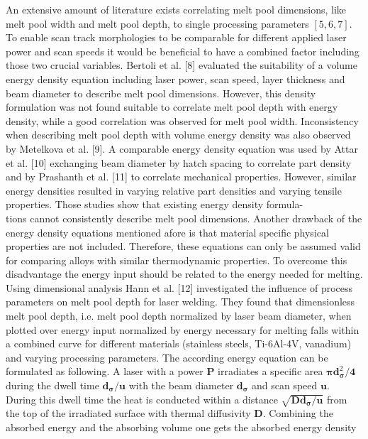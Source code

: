 \documentclass[10pt]{article}
\begin{document}
An extensive amount of literature exists correlating melt pool dimensions, like melt pool width and melt pool depth, to single processing parameters $[5,6,7]$. To enable scan track morphologies to be comparable for different applied laser power and scan speeds it would be beneficial to have a combined factor including those two crucial variables. Bertoli et al. [8] evaluated the suitability of a volume energy density equation including laser power, scan speed, layer thickness and beam diameter to describe melt pool dimensions. However, this density formulation was not found suitable to correlate melt pool depth with energy density, while a good correlation was observed for melt pool width. Inconsistency when describing melt pool depth with volume energy density was also observed by Metelkova et al. [9]. A comparable energy density equation was used by Attar et al. [10] exchanging beam diameter by hatch spacing to correlate part density and by Prashanth et al. [11] to correlate mechanical properties. However, similar energy densities resulted in varying relative part densities and varying tensile properties. Those studies show that existing energy density formula-\\
tions cannot consistently describe melt pool dimensions. Another drawback of the energy density equations mentioned afore is that material specific physical properties are not included. Therefore, these equations can only be assumed valid for comparing alloys with similar thermodynamic properties. To overcome this disadvantage the energy input should be related to the energy needed for melting. Using dimensional analysis Hann et al. [12] investigated the influence of process parameters on melt pool depth for laser welding. They found that dimensionless melt pool depth, i.e. melt pool depth normalized by laser beam diameter, when plotted over energy input normalized by energy necessary for melting falls within a combined curve for different materials (stainless steels, Ti-6Al-4V, vanadium) and varying processing parameters. The according energy equation can be formulated as following. A laser with a power $\boldsymbol{P}$ irradiates a specific area $\boldsymbol{\pi} \boldsymbol{d}_{\boldsymbol{\sigma}}^{2} / \mathbf{4}$ during the dwell time $\boldsymbol{d}_{\boldsymbol{\sigma}} / \boldsymbol{u}$ with the beam diameter $\boldsymbol{d}_{\boldsymbol{\sigma}}$ and scan speed $\boldsymbol{u}$. During this dwell time the heat is conducted within a distance $\sqrt{\boldsymbol{D} \boldsymbol{d}_{\boldsymbol{\sigma}} / \boldsymbol{u}}$ from the top of the irradiated surface with thermal diffusivity $\boldsymbol{D}$. Combining the absorbed energy and the absorbing volume one gets the absorbed energy density
\end{document}
